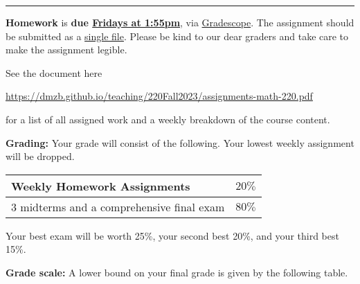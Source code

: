 \documentclass[12pt]{article}
\begin{document}
\hrule
\medskip

\noindent \textbf{Homework} is \textbf{due \underline{Fridays at 1:55pm}}, via \underline{Gradescope}. The assignment should be submitted as a \underline{single file}. Please be kind to our dear graders and take care to make the assignment legible.
\smallskip

\noindent See the document here
\begin{center}
  \url{https://dmzb.github.io/teaching/220Fall2023/assignments-math-220.pdf}
\end{center}
for a list of all assigned work and a weekly breakdown of the course content.
\medskip






\noindent\textbf{Grading:} 
Your grade will consist of the following. Your lowest weekly assignment will be dropped.

\begin{center}
  \begin{tabular}{|l|l|}
    \hline
    Weekly Homework Assignments & $20\%$ \\
    \hline    
    3 midterms and a comprehensive final exam  & $80\%$ 	 \\
    \hline
  \end{tabular}
\end{center}
Your best exam will be worth 25\%, your second best 20\%, and your third best 15\%.

\vspace*{.15in}
\noindent\textbf{Grade scale:} 
A lower bound on your final grade is given by the following table. 
\end{document}
